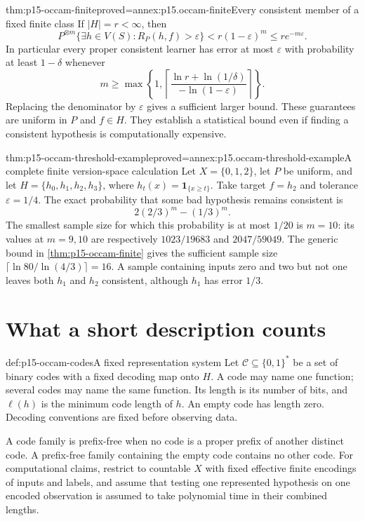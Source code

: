 \begin{hbtheorem}{thm:p15-occam-finite}{proved=annex:p15.occam-finite}{Every consistent member of a fixed finite class}
If \(|H|=r<\infty\), then
\[
 P^{\otimes m}\{\exists h\in V(S):R_P(h,f)>\varepsilon\}
      <r(1-\varepsilon)^m\leq r e^{-m\varepsilon}.
\]
In particular every proper consistent learner has error at most
\(\varepsilon\) with probability at least \(1-\delta\) whenever
\[
 m\geq
 \max\left\{1,\left\lceil
       \frac{\ln r+\ln(1/\delta)}{-\ln(1-\varepsilon)}
                         \right\rceil\right\}.
\]
Replacing the denominator by \(\varepsilon\) gives a sufficient
larger bound. These guarantees are uniform in \(P\) and \(f\in H\).
They establish a statistical bound even if finding a consistent
hypothesis is computationally expensive.
\end{hbtheorem}

\begin{hbtheorem}{thm:p15-occam-threshold-example}{proved=annex:p15.occam-threshold-example}{A complete finite version-space calculation}
Let \(X=\{0,1,2\}\), let \(P\) be uniform, and let
\(H=\{h_0,h_1,h_2,h_3\}\), where \(h_t(x)=\mathbf1_{\{x\geq t\}}\).
Take target \(f=h_2\) and tolerance \(\varepsilon=1/4\).
The exact probability that some bad hypothesis remains consistent is
\[
                 2(2/3)^m-(1/3)^m.
\]
The smallest sample size for which this probability is at most
\(1/20\) is \(m=10\): its values at \(m=9,10\) are respectively
\(1023/19683\) and \(2047/59049\).
The generic bound in \cref{thm:p15-occam-finite} gives the
sufficient sample size
\(\lceil\ln80/\ln(4/3)\rceil=16\).
A sample containing inputs zero and two but not one leaves
both \(h_1\) and \(h_2\) consistent, although \(h_1\) has error \(1/3\).
\end{hbtheorem}

\section{What a short description counts}

\begin{hbdefinition}{def:p15-occam-codes}{A fixed representation system}
Let \(\mathcal C\subseteq\{0,1\}^*\) be a set of binary codes with
a fixed decoding map onto \(H\). A code may name one function;
several codes may name the same function. Its length is its number
of bits, and \(\ell(h)\) is the minimum code length of \(h\).
An empty code has length zero. Decoding conventions are fixed
before observing data.

A code family is prefix-free when no code is a proper prefix
of another distinct code. A prefix-free family containing the
empty code contains no other code. For computational claims, restrict
to countable \(X\) with fixed effective finite encodings of inputs
and labels, and assume that testing
one represented hypothesis on one encoded observation is assumed
to take polynomial time in their combined lengths.
\end{hbdefinition}

